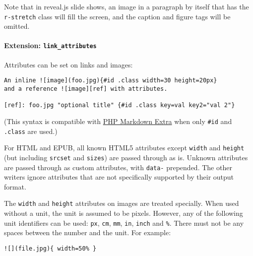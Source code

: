 Note that in reveal.js slide shows, an image in a paragraph by itself
that has the \texttt{r-stretch} class will fill the screen, and the
caption and figure tags will be omitted.

\hypertarget{extension-link_attributes}{%
\paragraph{\texorpdfstring{Extension:
\texttt{link\_attributes}}{Extension: link\_attributes}}\label{extension-link_attributes}}

Attributes can be set on links and images:

\begin{verbatim}
An inline ![image](foo.jpg){#id .class width=30 height=20px}
and a reference ![image][ref] with attributes.

[ref]: foo.jpg "optional title" {#id .class key=val key2="val 2"}
\end{verbatim}

(This syntax is compatible with
\href{https://michelf.ca/projects/php-markdown/extra/}{PHP Markdown
Extra} when only \texttt{\#id} and \texttt{.class} are used.)

For HTML and EPUB, all known HTML5 attributes except \texttt{width} and
\texttt{height} (but including \texttt{srcset} and \texttt{sizes}) are
passed through as is. Unknown attributes are passed through as custom
attributes, with \texttt{data-} prepended. The other writers ignore
attributes that are not specifically supported by their output format.

The \texttt{width} and \texttt{height} attributes on images are treated
specially. When used without a unit, the unit is assumed to be pixels.
However, any of the following unit identifiers can be used: \texttt{px},
\texttt{cm}, \texttt{mm}, \texttt{in}, \texttt{inch} and \texttt{\%}.
There must not be any spaces between the number and the unit. For
example:

\begin{verbatim}
![](file.jpg){ width=50% }
\end{verbatim}

